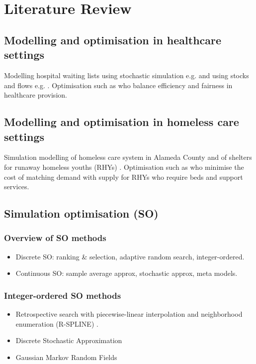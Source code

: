 \documentclass{article}
\begin{document}
\section{Literature Review} \label{lit-rev}

\subsection{Modelling and optimisation in healthcare settings}

Modelling hospital waiting lists using stochastic simulation e.g. \cite{wood2022supporting} and using stocks and flows e.g. \cite{worthington1991hospital}. Optimisation such as \cite{argyris2022fair} who balance efficiency and fairness in healthcare provision. 

\subsection{Modelling and optimisation in homeless care settings}

Simulation modelling of homeless care system in Alameda County \citep{singham2023discrete} and of shelters for runaway homeless youths (RHYs) \citep{kaya2022discrete}. Optimisation such as \cite{kaya2022improving} who minimise the cost of matching demand with supply for RHYs who require beds and support services.

\subsection{Simulation optimisation (SO)}

\subsubsection{Overview of SO methods}

\begin{itemize}[noitemsep]
\item Discrete SO: ranking \& selection, adaptive random search, integer-ordered.
\item Continuous SO: sample average approx, stochastic approx, meta models.
\end{itemize}

\subsubsection{Integer-ordered SO methods}
\begin{itemize} [noitemsep]
    \item Retrospective search with piecewise-linear interpolation and neighborhood enumeration (R-SPLINE) \citep{wang2013integer}.
    \item Discrete Stochastic Approximation \citep{lim2012stochastic}
    \item Gaussian Markov Random Fields \citep{l2019gaussian}
\end{itemize}
\end{document}
